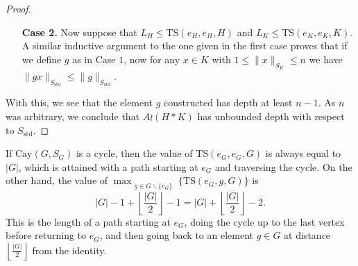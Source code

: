 \documentclass[reqno,oneside]{amsart}
\newcommand{\cay}[2]{\mathrm{Cay}(#1,#2)}
\newcommand{\std}{S_{\mathrm{std}}}
\newcommand{\TS}[3]{\mathrm{TS}\left(#1,#2,#3\right)}
\theoremstyle{plain}
\theoremstyle{definition}
\begin{document}
\begin{proof}
\begin{itemize}
		
		Now suppose that $x$ is of the form $x'hk$, for $h\in H\backslash\{e_H\}$, $k\in \backslash\{e_K\}$. Then looking at the petal decomposition of $\cay{H}{S_H}$ and using the inductive hypothesis,
		\begin{align*}
		\|gx\|_{\std}&=\|gx'hk\|_{\std}\\
		&=\|gx'h\|_{\std}+\TS{e_K}{k}{K}-\TS{e_K}{e_K}{K}\\
		&\le \|g\|_{\std}-1. 
		\end{align*}
		
		On the other hand, if $x$ is of the form $x'kh$ for $h\in H\backslash\{e_H\}$, $k\in \backslash\{e_K\}$. Similarly to the above we have,
		\begin{align*}
		\|gx\|_{\std}&=\|gx'kh\|_{\std}\\
		&=\|gx'k\|_{\std}+\TS{e_H}{h}{H}-\TS{e_H}{e_H}{H}\\
		&\le \|gx'k\|_{\std}+1\\
		&\le \|g\|_{\std}.
		\end{align*}
		This finishes the proof of the first case. By symmetry of $H$ and $K$, the proof for the case where $L_K=\TS{e_K}{e_K}{K}+1$ is completely analogous.
		\item[\textbf{Case 2.}] 
		Now suppose that $L_H\le \TS{e_H}{e_H}{H}$ and $L_K\le \TS{e_K}{e_K}{K}$. A similar inductive argument to the one given in the first case proves that if we define $g$ as in Case $1$, now for any $x\in K$ with $1\le \|x\|_{S_K}\le n$ we have $\|gx\|_{\std}\le \|g\|_{\std}$.
	\end{itemize}
	
	
	
	With this, we see that the element $g$ constructed has depth at least $n-1$. As $n$ was arbitrary, we conclude that $A\wr (H*K)$ has unbounded depth with respect to $\std$.
\end{proof}

If $\cay{G}{S_G}$ is a cycle, then the value of $\TS{e_G}{e_G}{G}$ is always equal to $|G|$, which is attained with a path starting at $e_G$ and traversing the cycle. On the other hand, the value of $\max_{\substack{g\in G\backslash\{e_G\}}}\Big\{ \TS{e_G}{g}{G}\Big\}$ is $$|G|-1+\left\lfloor \frac{|G|}{2}\right\rfloor-1=|G|+\left\lfloor \frac{|G|}{2}\right\rfloor-2.$$ This is the length of a path starting at $e_G$, doing the cycle up to the last vertex before returning to $e_G$, and then going back to an element $g\in G$ at distance $\left\lfloor \frac{|G|}{2}\right\rfloor$ from the identity.
\end{document}
